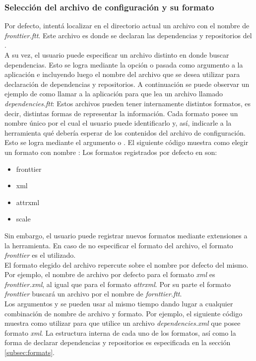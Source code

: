 \subsubsection{Selección del archivo de configuración y su formato}
\label{subsubsec:guide:confformat}

Por defecto, \fronttier intentá localizar en el directorio actual un
archivo con el nombre de \emph{fronttier.ftt}. Este archivo es donde
se declaran las dependencias y repositorios del \project.\\
A su vez, el usuario puede especificar un archivo distinto en donde
buscar dependencias. Esto se logra mediante la opción 
o  pasada como argumento a la aplicación e incluyendo luego el nombre del
archivo que se desea utilizar para declaración de dependencias
y repositorios. A continuación se puede observar un ejemplo de como
llamar a la aplicación para que lea un archivo llamado \emph{dependencies.ftt}:
Estos archivos pueden tener internamente distintos formatos, es decir, distintas
formas de representar la información. Cada formato posee un nombre único por el
cual el usuario puede identificarlo y, así, indicarle a la herramienta qué debería
esperar de
los contenidos del archivo de configuración. Esto se logra mediante el
argumento  o . El
siguiente código muestra como elegir un formato con nombre :
Los formatos registrados por defecto en \fronttier son:
\begin{itemize}
	\setlength{\itemsep}{1pt}
	\setlength{\parskip}{0pt}
	\setlength{\parsep}{0pt}
	\item fronttier
	\item xml
	\item attrxml
	\item scale
\end{itemize}
Sin embargo, el usuario puede registrar nuevos formatos mediante extensiones
a la herramienta. En caso de no especificar el formato del archivo, el
formato \emph{fronttier} es el utilizado.\\
El formato elegido del archivo repercute sobre el nombre por defecto del
mismo. Por ejemplo, el nombre de archivo por defecto para el
formato \emph{xml} es \emph{fronttier.xml}, al igual que para el formato
\emph{attrxml}. Por su parte el formato \emph{fronttier} buscará
un archivo por el nombre de \emph{fornttier.ftt}.\\
Los argumentos  y  se pueden usar al mismo
tiempo dando lugar a cualquier combinación de nombre de archivo y formato.
Por ejemplo, el siguiente código muestra como utilizar \fronttier para
que utilice un archivo \emph{dependencies.xml} que posee formato
\emph{xml}.
La estructura interna de cada uno de los formatos, así como la forma
de declarar dependencias y repositorios es especificada en la
sección \ref{subsec:formats}.

